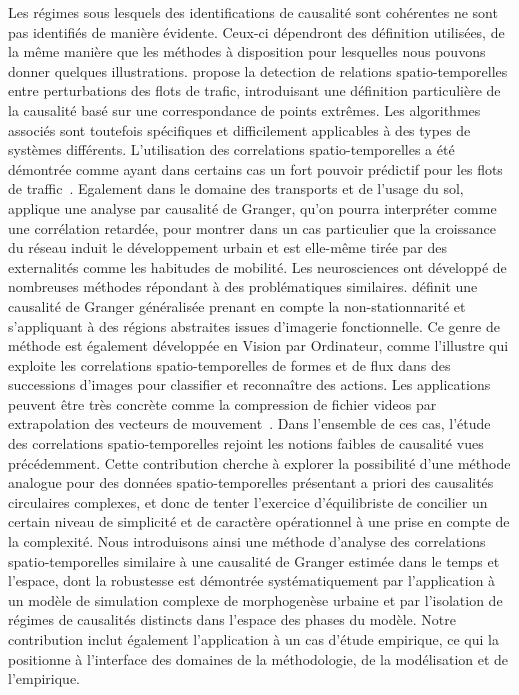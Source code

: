 Les régimes sous lesquels des identifications de causalité sont cohérentes ne sont pas identifiés de manière évidente. Ceux-ci dépendront des définition utilisées, de la même manière que les méthodes à disposition pour lesquelles nous pouvons donner quelques illustrations. \cite{liu2011discovering} propose la detection de relations spatio-temporelles entre perturbations des flots de trafic, introduisant une définition particulière de la causalité basé sur une correspondance de points extrêmes. Les algorithmes associés sont toutefois spécifiques et difficilement applicables à des types de systèmes différents. L'utilisation des correlations spatio-temporelles a été démontrée comme ayant dans certains cas un fort pouvoir prédictif pour les flots de traffic~\cite{min2011real}. Egalement dans le domaine des transports et de l'usage du sol, \cite{xie2009streetcars} applique une analyse par causalité de Granger, qu'on pourra interpréter comme une corrélation retardée, pour montrer dans un cas particulier que la croissance du réseau induit le développement urbain et est elle-même tirée par des externalités comme les habitudes de mobilité. Les neurosciences ont développé de nombreuses méthodes répondant à des problématiques similaires. \cite{luo2013spatio} définit une causalité de Granger généralisée prenant en compte la non-stationnarité et s'appliquant à des régions abstraites issues d'imagerie fonctionnelle. Ce genre de méthode est également développée en Vision par Ordinateur, comme l'illustre \cite{ke2007spatio} qui exploite les correlations spatio-temporelles de formes et de flux dans des successions d'images pour classifier et reconnaître des actions. Les applications peuvent être très concrète comme la compression de fichier videos par extrapolation des vecteurs de mouvement~\cite{chalidabhongse1997fast}. Dans l'ensemble de ces cas, l'étude des correlations spatio-temporelles rejoint les notions faibles de causalité vues précédemment. Cette contribution cherche à explorer la possibilité d'une méthode analogue pour des données spatio-temporelles présentant a priori des causalités circulaires complexes, et donc de tenter l'exercice d'équilibriste de concilier un certain niveau de simplicité et de caractère opérationnel à une prise en compte de la complexité. Nous introduisons ainsi une méthode d'analyse des correlations spatio-temporelles similaire à une causalité de Granger estimée dans le temps et l'espace, dont la robustesse est démontrée systématiquement par l'application à un modèle de simulation complexe de morphogenèse urbaine et par l'isolation de régimes de causalités distincts dans l'espace des phases du modèle. Notre contribution inclut également l'application à un cas d'étude empirique, ce qui la positionne à l'interface des domaines de la méthodologie, de la modélisation et de l'empirique.


